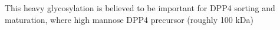 This heavy glycosylation is believed to be important for DPP4 sorting and maturation, where high mannose DPP4 precursor (roughly 100 kDa) \cite{Matter_1991}